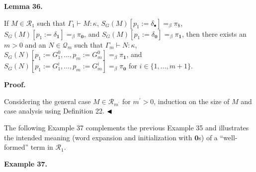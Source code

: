 \documentclass[10pt,a4paper]{amsart}
\begin{document}
 
 
\par\medskip\noindent\textbf{Lemma 36.}\par
 
 
If $M\in\mathcal{R}_{1}$ such that $\Gamma_{1}\vdash M:\kappa$, $S_{G}(M)[p_{1}:=\delta_{\bullet}]=_{\beta}\pi_{\$}$, $S_{G}(M)[p_{1}:=\delta_{\mathbf{1}}]=_{\beta}\pi_{\mathbf{0}}$, and $S_{G}(M)[p_{1}:=\delta_{\mathbf{0}}]=_{\beta}\pi_{\mathbf{1}}$, then there exists an $m>0$ and an $N\in\mathcal{Q}_{m}$ such that $\Gamma_{m}\vdash N:\kappa$, $S_{G}(N)[p_{1}:=G_{1}^{0},\ldots,p_{m}:=G_{m}^{0}]=_{\beta}\pi_{\mathbf{1}}$, and $S_{G}(N)[p_{1}:=G_{1}^{i},\ldots,p_{m}:=G_{m}^{i}]=_{\beta}\pi_{\mathbf{0}}$ for $i\in\{1,\ldots,m+1\}$.\par
 
 
 
 
 
\par\medskip\noindent\textbf{Proof.}\par
 
 
Considering the general case $M\in\mathcal{R}_{m^{\prime}}$ for $m^{\prime}>0$, induction on the size of $M$ and case analysis using Definition 22. $\hfill\blacktriangleleft$\par
 
 
 
The following Example 37 complements the previous Example 35 and illustrates the intended meaning (word expansion and initialization with $\mathbf{0}$s) of a “well-formed” term in $\mathcal{R}_{1}$.\par
 
 
 
\par\medskip\noindent\textbf{Example 37.}\par
 
 
\end{document}
